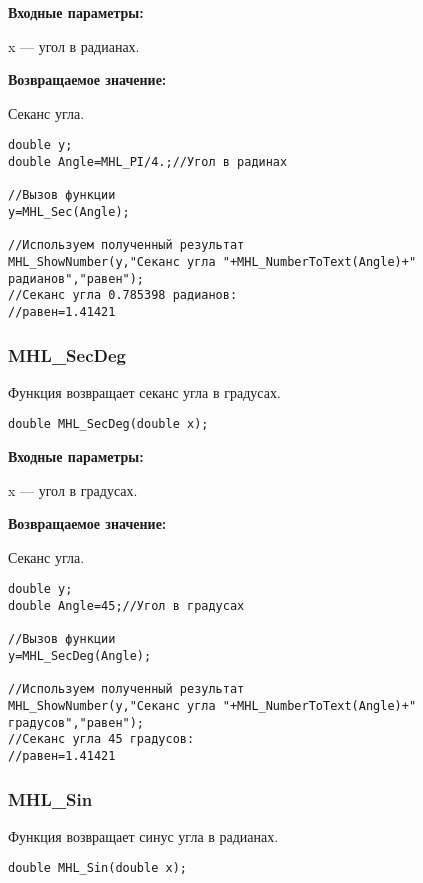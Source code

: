 \documentclass[a4paper,12pt]{article}
\begin{document}
\textbf{Входные параметры:}

 x --- угол в радианах.

\textbf{Возвращаемое значение:}

Секанс угла.


\begin{lstlisting}[label=code_use_MHL_Sec,caption=Пример использования]
double y;
double Angle=MHL_PI/4.;//Угол в радинах

//Вызов функции
y=MHL_Sec(Angle);

//Используем полученный результат
MHL_ShowNumber(y,"Секанс угла "+MHL_NumberToText(Angle)+" радианов","равен");
//Секанс угла 0.785398 радианов:
//равен=1.41421
\end{lstlisting}

\subsubsection{MHL\_SecDeg}\label{MHL_SecDeg}

Функция возвращает секанс угла в градусах.


\begin{lstlisting}[label=code_syntax_MHL_SecDeg,caption=Синтаксис]
double MHL_SecDeg(double x);
\end{lstlisting}

\textbf{Входные параметры:}

 x --- угол в градусах.

\textbf{Возвращаемое значение:}

Секанс угла.


\begin{lstlisting}[label=code_use_MHL_SecDeg,caption=Пример использования]
double y;
double Angle=45;//Угол в градусах

//Вызов функции
y=MHL_SecDeg(Angle);

//Используем полученный результат
MHL_ShowNumber(y,"Секанс угла "+MHL_NumberToText(Angle)+" градусов","равен");
//Секанс угла 45 градусов:
//равен=1.41421
\end{lstlisting}

\subsubsection{MHL\_Sin}\label{MHL_Sin}

Функция возвращает синус угла в радианах.


\begin{lstlisting}[label=code_syntax_MHL_Sin,caption=Синтаксис]
double MHL_Sin(double x);
\end{lstlisting}
\end{document}
